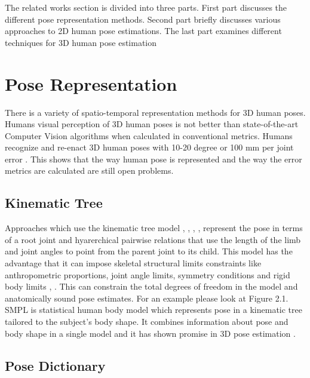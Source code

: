 The related works section is divided into three parts. First part discusses the different pose representation methods. Second part briefly discusses various approaches to 2D human pose estimations. The last part examines different techniques for 3D human pose estimation 

\section{Pose Representation}

There is a variety of spatio-temporal representation methods for 3D human poses. Humans visual perception of 3D human poses is not better than state-of-the-art Computer Vision algorithms when calculated in conventional metrics. Humans recognize and re-enact 3D human poses with 10-20 degree or 100 mm per joint error \parencite{marinoiu2013pictorial}. This shows that the way human pose is represented and the way the error metrics are calculated are still open problems.

\subsection{Kinematic Tree}

Approaches which use the kinematic tree model \parencite{barron2001estimating}, \parencite{wei2009modeling}, \parencite{zhou2016deep}, \parencite{sun2017compositional}, \parencite{mehta2017monocular} represent the pose in terms of a root joint and hyarerchical pairwise relations that use the length of the limb and joint angles to point from the parent joint to its child. This model has the advantage that it can impose  skeletal structural limits constraints like anthropometric proportions, joint angle limits, symmetry conditions and rigid body limits \parencite{dabral2017structure}, \parencite{wei2009modeling}. This can constrain the total degrees of freedom in the model and anatomically sound pose estimates. For an example please look at Figure 2.1. SMPL \parencite{loper2015smpl} is statistical human body model which represents pose in a kinematic tree tailored to the subject’s body shape. It combines information about pose and body shape in a single model and it has shown promise in 3D pose estimation \parencite{bogo2016keep}.

\subsection{Pose Dictionary}

